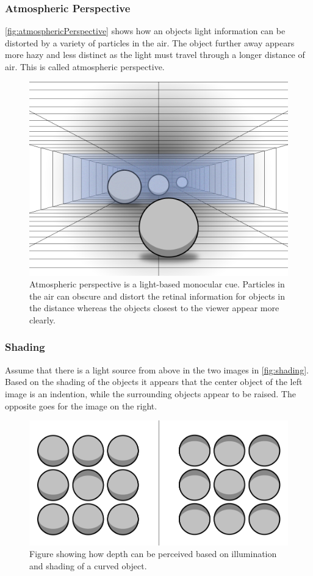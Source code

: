 \subsubsection{Atmospheric Perspective}
\autoref{fig:atmosphericPerspective} shows how an objects light information can be distorted by a variety of particles in the air. The object further away appears more hazy and less distinct as the light must travel through a longer distance of air. This is called atmospheric perspective\citep{sensationPerception}.
\begin{figure}[H]
	\centering
	\includegraphics[width=0.8\linewidth]{figure/Analysis/atmosphericPerspective2.png}
	\caption{Atmospheric perspective is a light-based monocular cue. Particles in the air can obscure and distort the retinal information for objects in the distance whereas the objects closest to the viewer appear more clearly.}
	\label{fig:atmosphericPerspective}
\end{figure}

\subsubsection{Shading}
Assume that there is a light source from above in the two images in \autoref{fig:shading}. Based on the shading of the objects it appears that the center object of the left image is an indention, while the surrounding objects appear to be raised. The opposite goes for the image on the right\citep{sensationPerception}.
\begin{figure}[H]
	\centering
	\includegraphics[width=0.8\linewidth]{figure/Analysis/shading.png}
	\caption{Figure showing how depth can be perceived based on illumination and shading of a curved object.}
	\label{fig:shading}
\end{figure}

